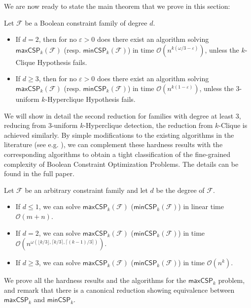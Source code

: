 \documentclass[a4paper,UKenglish,cleveref, autoref, thm-restate,numberwithinsect]{lipics-v2021}
\newcommand{\bigO}{\mathcal{O}}
\newcommand{\maxcspk}{\textsf{maxCSP}_{k}}
\newcommand{\mincspk}{\textsf{minCSP}_{k}}
\newcommand{\Fam}{\mathcal{F}}
\begin{document}
We are now ready to state the main theorem that we prove in this section:
\begin{theorem}\label{th:CSP-hardness}
    Let $\Fam$ be a Boolean constraint family of degree $d$.
    \begin{itemize}
        \item If $d = 2$, then for no $\varepsilon>0$ does there exist an algorithm solving $\maxcspk(\Fam)$ (resp. $\mincspk(\Fam)$) in time $\bigO(n^{k(\omega/3 -\varepsilon)})$, unless the $k$-Clique Hypothesis fails.
        \item If $d \geq 3$, then for no $\varepsilon>0$ does there exist an algorithm solving $\maxcspk(\Fam)$ (resp. $\mincspk(\Fam)$) in time $\bigO(n^{k(1 -\varepsilon)})$, unless the $3$-uniform $k$-Hyperclique Hypothesis fails. \label{item:CSP-hardness-2}
    \end{itemize}
\end{theorem}
\medskip
We will show in detail the second reduction for families with degree at least $3$, reducing from $3$-uniform $k$-Hyperclique detection, 
the reduction from $k$-Clique is achieved similarly.
By simple modifications to the existing algorithms in the literature (see e.g. \cite{LincolnWW18,Wil07}), we can complement these hardness results with the corresponding algorithms to obtain a tight classification of the fine-grained complexity of Boolean Constraint Optimization Problems. The details can be found in the full paper.
\begin{theorem}\label{thm:algorithms}
    Let $\Fam$ be an arbitrary constraint family and let $d$ be the degree of $\Fam$.
    \begin{itemize}
        \item If $d\leq 1$, we can solve $\maxcspk(\Fam)$ ($\mincspk(\Fam)$) in linear time $\bigO(m+n)$.
        \item If $d = 2$, we can solve $\maxcspk(\Fam)$ ($\mincspk(\Fam)$) in time $\bigO(n^{\omega (\lfloor k/3\rfloor,\lceil k/3\rceil,\lceil (k-1)/3\rceil)})$.
        \item If $d \geq 3$, we can solve $\maxcspk(\Fam)$ ($\mincspk(\Fam)$) in time $\bigO(n^{k})$.
    \end{itemize}
\end{theorem}
We prove all the hardness results and the algorithms for the $\maxcspk$ problem, and remark that there is a canonical reduction showing equivalence between $\maxcspk$ and $\mincspk$.
\end{document}
